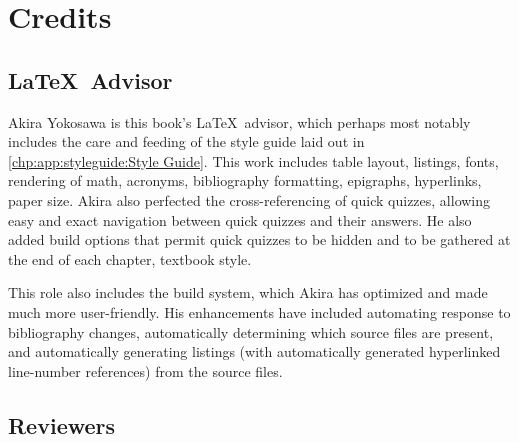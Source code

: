 
\chapter{Credits}
\label{bck:ack:Credits}
%



\section{\LaTeX\ Advisor}

Akira Yokosawa is this book's \LaTeX\ advisor, which perhaps most
notably includes the care and feeding of the style guide laid out
in \cref{chp:app:styleguide:Style Guide}\@.
This work includes table layout, listings, fonts, rendering of math,
acronyms, bibliography formatting, epigraphs, hyperlinks, paper size.
Akira also perfected the cross-referencing of quick quizzes, allowing
easy and exact navigation between quick quizzes and their answers.
He also added build options that permit quick quizzes to be hidden
and to be gathered at the end of each chapter, textbook style.

This role also includes the build system, which Akira has optimized and
made much more user-friendly.
His enhancements have included automating response to bibliography
changes, automatically determining which source files are present,
and automatically generating listings (with automatically generated
hyperlinked line-number references) from the source files.

\section{Reviewers}

